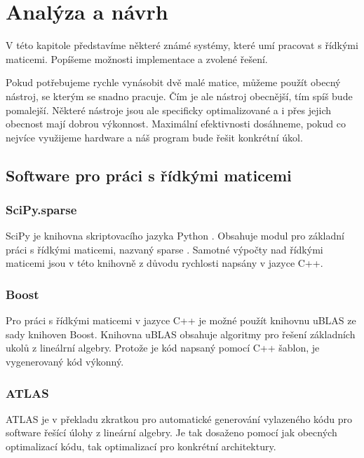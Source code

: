 \chapter{Analýza a návrh}

V této kapitole představíme některé známé systémy, které umí pracovat s řídkými maticemi. Popíšeme možnosti implementace a zvolené řešení.

Pokud potřebujeme rychle vynásobit dvě malé matice, můžeme použít obecný nástroj, se kterým se snadno pracuje. Čím je ale nástroj obecnější, tím spíš bude pomalejší. Některé nástroje jsou ale specificky optimalizované a i přes jejich obecnost mají dobrou výkonnost. Maximální efektivnosti dosáhneme, pokud co nejvíce využijeme hardware a náš program bude řešit konkrétní úkol. 

\section{Software pro práci s řídkými maticemi}

\subsection{SciPy.sparse}

SciPy je knihovna skriptovacího jazyka Python \cite{Python}. Obsahuje modul pro základní práci s řídkými maticemi, nazvaný sparse \cite{scipy}. Samotné výpočty nad řídkými maticemi jsou v této knihovně z důvodu rychlosti napsány v jazyce C++.

\subsection{Boost}

Pro práci s řídkými maticemi v jazyce C++ je možné použít knihovnu uBLAS\cite{ublas} ze sady knihoven Boost\cite{boost}. Knihovna uBLAS obsahuje algoritmy pro řešení základních ukolů z lineálrní algebry. Protože je kód napsaný pomocí C++ šablon, je vygenerovaný kód výkonný.

\subsection{ATLAS}

ATLAS \cite{atlas} je v překladu zkratkou pro automatické generování vylazeného kódu pro software řešící úlohy z lineární algebry. Je tak dosaženo pomocí jak obecných optimalizací kódu, tak optimalizací pro konkrétní architektury.

